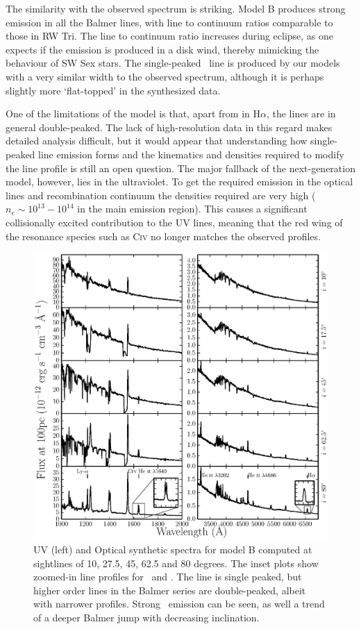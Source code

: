 \documentclass[preprint, a4paper, 11pt]{aastex}
\begin{document}
The similarity with the observed spectrum is striking. 
Model B produces strong emission in all the Balmer lines, 
with line to continuum ratios
comparable to those in RW Tri. 
The line to continuum ratio increases during eclipse,
as one expects if the emission is produced in a disk wind, 
thereby mimicking the behaviour of SW Sex stars.
The single-peaked \ha\ line is produced by our models with a 
very similar width to the observed spectrum, although it is perhaps slightly more
`flat-topped' in the synthesized data.

One of the limitations of the model is that, apart 
from in H$\alpha$, the lines are in general double-peaked. 
The lack of high-resolution data in this regard makes detailed analysis difficult,
but it would appear that understanding how single-peaked 
line emission forms and the kinematics and densities required to
modify the line profile is still an open question. 
The major fallback of the next-generation model, however, lies
in the ultraviolet. To get the required emission in the optical lines
and recombination continuum the densities required are very high 
($n_e\sim10^{13}-10^{14}$ in the main emission region).
This causes a significant collisionally excited contribution
to the UV lines, meaning that the red wing of the 
resonance species such as C\textsc{iv} no longer matches the
observed profiles. 




\begin{figure} %
\includegraphics[width=\textwidth]{figures/fig14_uv_opt.eps}
\caption{
UV (left) and Optical synthetic spectra for model B computed at
sightlines of 10, 27.5, 45, 62.5 and 80 degrees.	
The inset plots show zoomed-in line profiles for 
\heiiuv\ and \ha. The \ha line 
is single peaked, but higher order lines in the Balmer series
are double-peaked, albeit with narrower profiles.
Strong \heiiopt\ emission can be seen, as well a trend
of a deeper Balmer jump with decreasing inclination.
}
\label{uvoptb}
\end{figure} %
\end{document}
